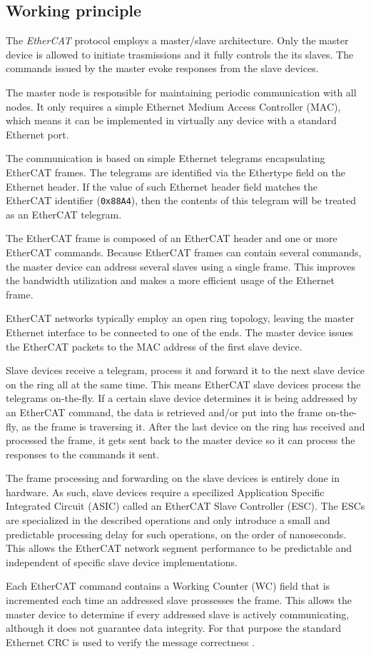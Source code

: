 \subsection{Working principle} \label{subsec:ecat_principle}

The \emph{EtherCAT} protocol employs a master/slave architecture.
Only the master device is allowed to initiate trasmissions and it fully controls the its slaves.
The commands issued by the master evoke responses from the slave devices.

The master node is responsible for maintaining periodic communication with all nodes.
It only requires a simple Ethernet Medium Access Controller (MAC), which means it can be implemented in virtually any device with a standard Ethernet port.

The communication is based on simple Ethernet telegrams encapsulating EtherCAT frames.
The telegrams are identified via the Ethertype field on the Ethernet header.
If the value of such Ethernet header field matches the EtherCAT identifier (\verb|0x88A4|), then the contents of this telegram will be treated as an EtherCAT telegram.

The EtherCAT frame is composed of an EtherCAT header and one or more EtherCAT commands.
Because EtherCAT frames can contain several commands, the master device can address several slaves using a single frame.
This improves the bandwidth utilization and makes a more efficient usage of the Ethernet frame.

EtherCAT networks typically employ an open ring topology, leaving the master Ethernet interface to be connected to one of the ends.
The master device issues the EtherCAT packets to the MAC address of the first slave device.

Slave devices receive a telegram, process it and forward it to the next slave device on the ring all at the same time.
This means EtherCAT slave devices process the telegrams on-the-fly.
If a certain slave device determines it is being addressed by an EtherCAT command, the data is retrieved and/or put into the frame on-the-fly, as the frame is traversing it.
After the last device on the ring has received and processed the frame, it gets sent back to the master device so it can process the responses to the commands it sent.

The frame processing and forwarding on the slave devices is entirely done in hardware.
As such, slave devices require a specilized Application Specific Integrated Circuit (ASIC) called an EtherCAT Slave Controller (ESC).
The ESCs are specialized in the described operations and only introduce a small and predictable processing delay for such operations, on the order of nanoseconds.
This allows the EtherCAT network segment performance to be predictable and independent of specific slave device implementations.

Each EtherCAT command contains a Working Counter (WC) field that is incremented each time an addressed slave prossesses the frame.
This allows the master device to determine if every addressed slave is actively communicating, although it does not guarantee data integrity.
For that purpose the standard Ethernet CRC is used to verify the message correctness \cite{technology:rte2}.
